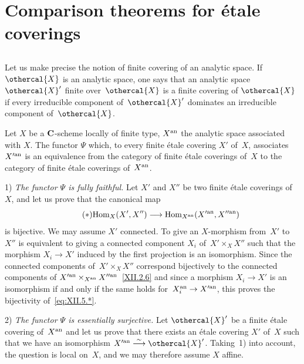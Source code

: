 \section{Comparison theorems for \'etale coverings}
\label{XII.5}
\setcounter{subsection}{-1}
\subsection{}
\label{XII.5.0}
Let us make precise the notion of finite covering of an analytic space.
If $\othercal{X}$ is an analytic space, one says that an analytic space
$\othercal{X}'$ finite over~$\othercal{X}$ is a finite covering of
$\othercal{X}$ if every irreducible component of~$\othercal{X}'$ dominates
an irreducible component of~$\othercal{X}$.

\begin{theorem}
\label{XII.5.1}
Let $X$ be a $\mathbf{C}$-scheme locally of finite type, $X^{\mathrm{an}}$
the analytic space associated with $X$. The functor $\Psi$ which,
to every finite \'etale covering $X'$ of~$X$, associates
$X^{\prime\mathrm{an}}$ is an equivalence
from the category of finite \'etale coverings of~$X$ to
the category of finite \'etale coverings of~$X^{\mathrm{an}}$.
\end{theorem}

1) \emph{The functor $\Psi$ is fully faithful.} Let $X'$
and $X''$ be two finite \'etale coverings of~$X$, and let us prove that
the canonical map
\begin{equation*}
\label{eq:XII.5.*}
\tag{$*$} { \Hom_{X}(X',X'') \to
\Hom_{X^{\an}}(X^{\prime\an},X^{\prime\prime\an}) }
\end{equation*}
is bijective. We may assume $X'$ connected. To give an
$X$-morphism from~$X'$ to $X''$ is equivalent to giving a
connected component $X_{i}$ of~$X'\times_{X}X''$ such that the morphism
$X_{i}\to X'$ induced by the first projection is an
isomorphism. Since the connected components of~$X'\times_{X}X''$
correspond bijectively to the connected components of
$X^{\prime\mathrm{an}}\times_{X^{\mathrm{an}}}X^{\prime\prime\mathrm{an}}$~\eqref{XII.2.6} and since a
morphism $X_{i}\to X'$ is an isomorphism if and only if the same
holds for~$X_{i}^{\an}\to X^{\prime\an}$, this proves the
bijectivity of~\eqref{eq:XII.5.*}.

2) \emph{The functor $\Psi$ is essentially surjective.} Let
$\othercal{X}'$ be a finite \'etale covering of~$X^{\mathrm{an}}$ and let us prove
that there exists an \'etale covering $X'$ of~$X$ such that we have
an isomorphism $X^{\prime\an}\isomto\othercal{X}'$. Taking~1) into account, the
question is local on~$X$, and we may therefore assume $X$ affine.

